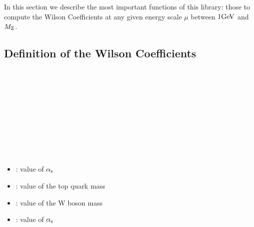 
In this section we describe the most important functions of this library:
those to compute the Wilson Coefficients at any given energy scale $\mu$ 
between $1 \mathrm{GeV}$ and $M_{\mathrm Z}$.

\subsection{Definition of the Wilson Coefficients}

\\
\\
\\
\\
\\
\\
\\
\\
\\

\begin{itemize}
\item {}: value of $\alpha_{\rm s}$
\item {}: value of the top quark mass
\item {}: value of the W boson mass
\item {}: value of $\alpha_{\rm e}$
\end{itemize}

